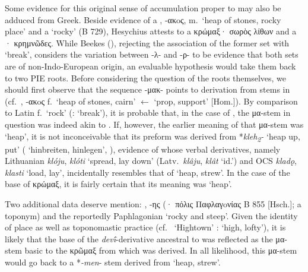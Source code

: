 \documentclass[output=paper,colorlinks,citecolor=brown]{langscibook}
\begin{document}
Some evidence for this original sense of accumulation proper to  may also be adduced from Greek. Beside evidence of a , -ακoς, m.\ ‘heap of stones, rocky place’ and a  ‘rocky’ (B 729), Hesychius attests to a κρώμαξ· σωρὸς λίθων  and a · κρημνῶδες. While Beekes (), rejecting the association of the former set with  ‘break’, considers the variation between -λ- and -ρ- to be evidence that both sets are of non-Indo-European origin, an evaluable hypothesis would take them back to two PIE roots. Before considering the question of the roots themselves, we should first observe that the sequence -μακ- points to derivation from stems in  (cf.\ , -ακoς f.\ ‘heap of stones, cairn’ $\leftarrow$  ‘prop, support’ [Hom.\+]). By comparison to Latin  f.\ ‘rock’ (:  ‘break’), it is probable that, in the case of , the μα-stem  in question was indeed akin to . If, however, the earlier meaning of that μα-stem was ‘heap’, it is not inconceivable that its preform was derived from *\textit{kleh\textsubscript{2}-} ‘heap up, put’ ( ‘hinbreiten, hinlegen’, ), evidence of whose verbal derivatives, namely Lithuanian \textit{klóju}, \textit{klóti} ‘spread, lay down’ (Latv.\ \textit{klâju}, \textit{klât} ‘id.’) and OCS \textit{kladǫ}, \textit{klasti} ‘load, lay’, incidentally resembles that of  ‘heap, strew’. In the case of the base of κρώμαξ, it is fairly certain that its meaning was ‘heap’.

  Two additional data deserve mention: , -ης (· πόλις   \mbox{Παφλαγoνίας} B 855 [Hsch.]; a toponym) and the reportedly Paphlagonian  ‘rocky and steep’. Given the identity of place as well as toponomastic practice (cf.\  ‘Hightown’ :  ‘high, lofty’), it is likely that the base of the \textit{devī́}-derivative ancestral to  was reflected as the μα-stem basic to the κρῶμαξ    from which  was derived.  In all likelihood, this μα-stem would go back to a \mbox{*\textit{-men}-} stem derived from  ‘heap, strew’.
\end{document}
